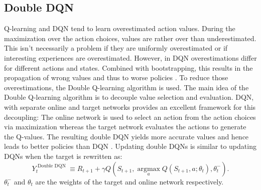 \subsection{Double DQN}
Q-learning  and DQN tend to learn overestimated action values. During the maximization over the action choices, values are rather over than underestimated.
This isn't necessarily a problem if they are uniformly overestimated or if interesting experiences are overestimated. However, in DQN overestimations differ for different actions and states. Combined with bootstrapping, this results in the propagation of wrong values and thus to worse policies \cite{DBLP:journals/corr/HasseltGS15}. To reduce those overestimations, the Double Q-learning algorithm \cite{DBLP:journals/corr/HasseltGS15} is used. 
The main idea of the Double Q-learning algorithm is to decouple value selection and evaluation.
DQN, with separate online and target networks provides an excellent framework for this decoupling:
The online network is used to select an action from the action choices via maximization whereas the target network evaluates the actions to generate the Q-values.
The resulting double DQN yields more accurate values and hence leads to better policies than DQN \cite{DBLP:journals/corr/HasseltGS15}.
Updating double DQNs is similar to updating DQNs when the target is rewritten as:
\begin{equation}\label{eq:DDQN-target}
Y_{t}^{\text { Double DQN }} \equiv R_{t+1}+\gamma Q\left(S_{t+1}, \underset{a}{\operatorname{argmax}} Q\left(S_{t+1}, a ; \theta_{t}\right), \theta_{t}^{-}\right).
\end{equation}
$\theta_{t}^{-}$ and $\theta_{t}$ are the weights of the target and online network respectively.
